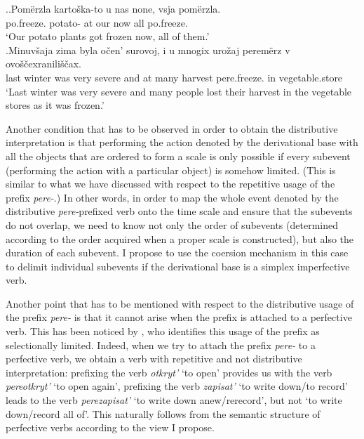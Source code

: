 \ex.\ag.\label{ex:po:merz}Pom\"{e}rzla karto\v{s}ka-to u nas none, vsja pom\"{e}rzla.\\
po.freeze. potato- at our now all po.freeze.\\
\trans `Our potato plants got frozen now, all of them.'\\
\bg.\label{ex:pere:merz}Minuv\v{s}aja zima byla o\v{c}en' surovoj, i u mnogix uro\v{z}aj perem\"{e}rz v ovo\v{s}\v{c}exranili\v{s}\v{c}ax.\\
last winter was very severe and at many harvest pere.freeze. in vegetable.store\\
\trans `Last winter was very severe and many people lost their harvest in the vegetable stores as it was frozen.'

Another condition that has to be observed in order to obtain the distributive interpretation is that performing the action denoted by the derivational base with all the objects that are ordered to form a scale is only possible if every subevent (performing the action with a particular object) is somehow limited. (This is similar to what we have discussed with respect to the repetitive usage of the prefix \textit{pere-}.) In other words, in order to map the whole event denoted by the distributive \textit{pere-}prefixed verb onto the time scale and ensure that the subevents do not overlap, we need to know not only the order of subevents (determined according to the order acquired when a proper scale is constructed), but also the duration of each subevent. I propose to use the coersion mechanism in this case to delimit individual subevents if the derivational base is a simplex imperfective verb.

Another point that has to be mentioned with respect to the distributive usage of the prefix \textit{pere-} is that it cannot arise when the prefix is attached to a perfective verb. This has been noticed by \citet{Tatevosov:09}, who identifies this usage of the prefix as selectionally limited. Indeed, when we try to attach the prefix \textit{pere-} to a perfective verb, we obtain a verb with repetitive and not distributive interpretation: prefixing the verb \textit{otkryt'} `to open' provides us with the verb \textit{pereotkryt'} `to open again', prefixing the verb \textit{zapisat'} `to write down/to record' leads to the verb \textit{perezapisat'} `to write down anew/rerecord', but not `to write down/record all of'. This naturally follows from the semantic structure of perfective verbs according to the view I propose.

